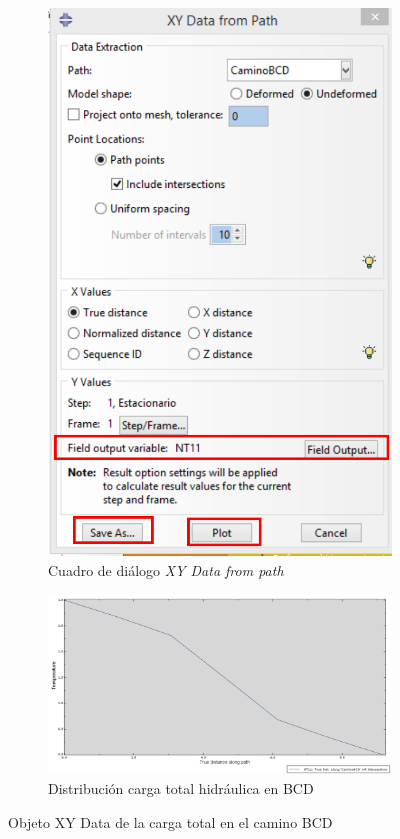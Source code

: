 \begin{itemize}
\begin{figure}[!h]
\begin{subfigure}[!h]{0.33\textwidth}
      \includegraphics[width=\textwidth]{./body/images/post33.pdf}
      \caption{Cuadro de diálogo \textit{XY Data from path}}
      \label{post33}
    \end{subfigure}%

    \begin{subfigure}[!h]{0.80\textwidth}
      \includegraphics[width=\textwidth]{./body/images/post34}
      \caption{Distribución carga total hidráulica en BCD}
      \label{post34}
    \end{subfigure}%
    \caption{Objeto XY Data de la carga total en el camino BCD}
  \end{figure}


\end{itemize}

